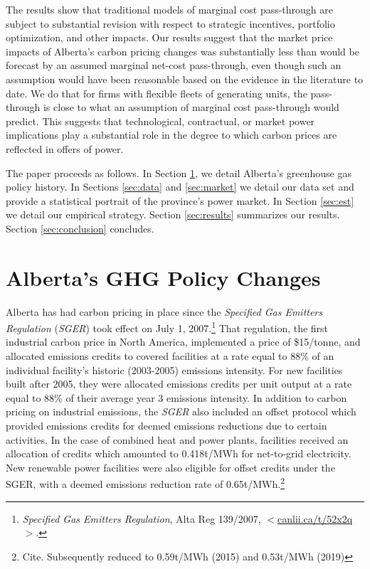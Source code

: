 \documentclass[12pt]{article}
\begin{document}
The results show that traditional models of marginal cost pass-through are subject to substantial revision with respect to strategic incentives, portfolio optimization, and other impacts. Our results suggest that the market price impacts of Alberta's carbon pricing changes was substantially less than would be forecast by an assumed marginal net-cost pass-through, even though such an assumption would have been reasonable based on the evidence in the literature to date. We do that for firms with flexible fleets of generating units, the pass-through is close to what an assumption of marginal cost pass-through would predict. This suggests that technological, contractual, or market power implications play a substantial role in the degree to which carbon prices are reflected in offers of power.

The paper proceeds as follows. In Section \ref{sec:policy}, we detail Alberta's greenhouse gas policy history. In Sections \ref{sec:data} and \ref{sec:market} we detail our data set and provide a statistical portrait of the province's power market. In Section \ref{sec:est} we detail our empirical strategy. Section \ref{sec:results} summarizes our results. Section \ref{sec:conclusion} concludes.

\section{Alberta's GHG Policy Changes}\label{sec:policy}

Alberta has had carbon pricing in place since the \emph{Specified Gas Emitters Regulation} (\emph{SGER}) took effect on July 1, 2007.\footnote{\textit{Specified Gas Emitters Regulation}, Alta Reg 139/2007, $<$\url{canlii.ca/t/52x2q}$>$.} That regulation, the first industrial carbon price in North America, implemented a price of \$15/tonne, and allocated emissions credits to covered facilities at a rate equal to 88\% of an individual facility's historic (2003-2005) emissions intensity. For new facilities built after 2005, they were allocated emissions credits per unit output at a rate equal to 88\% of their average year 3 emissions intensity. In addition to carbon pricing on industrial emissions, the \emph{SGER} also included an offset protocol which provided emissions credits for deemed emissions reductions due to certain activities. In the case of combined heat and power plants, facilities received an allocation of credits which amounted to 0.418t/MWh for net-to-grid electricity. New renewable power facilities were also eligible for offset credits under the SGER, with a deemed emissions reduction rate of 0.65t/MWh.\footnote{Cite. Subsequently reduced to 0.59t/MWh (2015) and 0.53t/MWh (2019)}
\end{document}
